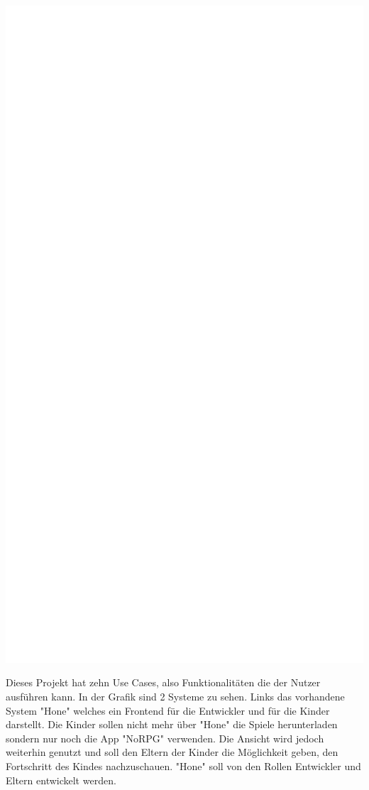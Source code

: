 	\begin{center}
		\includegraphics[width=\textwidth]{pics/OUCD.pdf}
	\end{center}
	
	Dieses Projekt hat zehn Use Cases, also Funktionalitäten die der Nutzer ausführen kann. In der Grafik sind 2 Systeme zu sehen. Links das vorhandene System "Hone" welches ein Frontend für die Entwickler und für die Kinder darstellt. Die Kinder sollen nicht mehr über "Hone" die Spiele herunterladen sondern nur noch die App "NoRPG" verwenden. Die Ansicht wird jedoch weiterhin genutzt und soll den Eltern der Kinder die Möglichkeit geben, den Fortschritt des Kindes nachzuschauen. "Hone" soll von den Rollen Entwickler und Eltern entwickelt werden.
	
